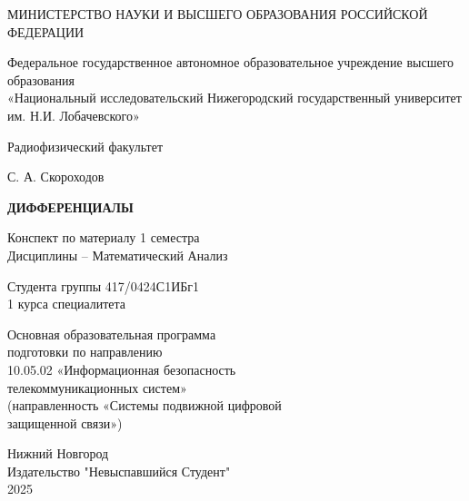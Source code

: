 \begin{titlepage}
	\centering
	\MakeUppercase{Министерство науки и высшего образования российской федерации}

	\vspace{1cm}
	Федеральное государственное автономное образовательное учреждение высшего образования\\
	«Национальный исследовательский Нижегородский государственный университет им. Н.И. Лобачевского»

	\vspace{1cm}
	Радиофизический факультет

	\vspace{1.5cm}
	С. А. Скороходов

	\vspace{1cm}
	{\Huge\bfseries\MakeUppercase{Дифференциалы}}

	\vspace{1cm}
	Конспект по материалу 1 семестра\\
	Дисциплины -- Математический Анализ

	\vspace{1cm}
	Студента группы 417/0424С1ИБг1\\
	1 курса специалитета

	\vspace{1cm}
	Основная образовательная программа\\
	подготовки по направлению\\
	10.05.02 «Информационная безопасность\\
	телекоммуникационных систем»\\
	(направленность «Системы подвижной цифровой\\
	защищенной связи»)

	\vfill
	Нижний Новгород \\ Издательство "Невыспавшийся Студент" \\ 2025
\end{titlepage}